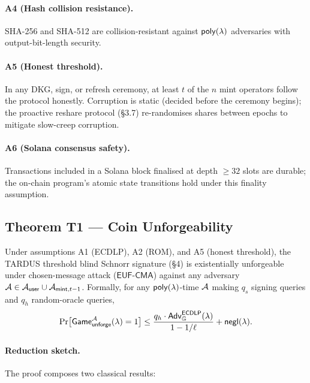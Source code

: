 \paragraph{A4 (Hash collision resistance).}
\label{assn:cr}
SHA-256 and SHA-512 are collision-resistant against $\mathsf{poly}(\lambda)$
adversaries with output-bit-length security.

\paragraph{A5 (Honest threshold).}
\label{assn:threshold}
In any DKG, sign, or refresh ceremony, at least $t$ of the $n$ mint
operators follow the protocol honestly. Corruption is static
(decided before the ceremony begins); the proactive reshare protocol
(\S3.7) re-randomises shares between epochs to mitigate
slow-creep corruption.

\paragraph{A6 (Solana consensus safety).}
\label{assn:solana}
Transactions included in a Solana block finalised at depth $\geq 32$ slots
are durable; the on-chain program's atomic state transitions hold under
this finality assumption.

\subsection{Theorem T1 --- Coin Unforgeability}
\label{sec:thm-unforgeability}

\begin{theorem}
\label{thm:unforgeability}
Under assumptions A1 (ECDLP), A2 (ROM), and A5 (honest threshold), the
TARDUS threshold blind Schnorr signature (\S4) is
existentially unforgeable under chosen-message attack
($\mathsf{EUF\text{-}CMA}$) against any adversary $\mathcal{A} \in
\mathcal{A}_{\mathsf{user}} \cup \mathcal{A}_{\mathsf{mint},t-1}$. Formally, for any
$\mathsf{poly}(\lambda)$-time $\mathcal{A}$ making $q_s$ signing queries and $q_h$
random-oracle queries,
\[
  \Pr\bigl[\mathsf{Game}_{\mathsf{unforge}}^{\mathcal{A}}(\lambda) = 1\bigr] \leq
  \frac{q_h \cdot \mathsf{Adv}^{\mathsf{ECDLP}}_{\mathbb{G}}(\lambda)}{1 - 1/\ell}
  + \mathsf{negl}(\lambda).
\]
\end{theorem}

\paragraph{Reduction sketch.} The proof composes two classical results:

